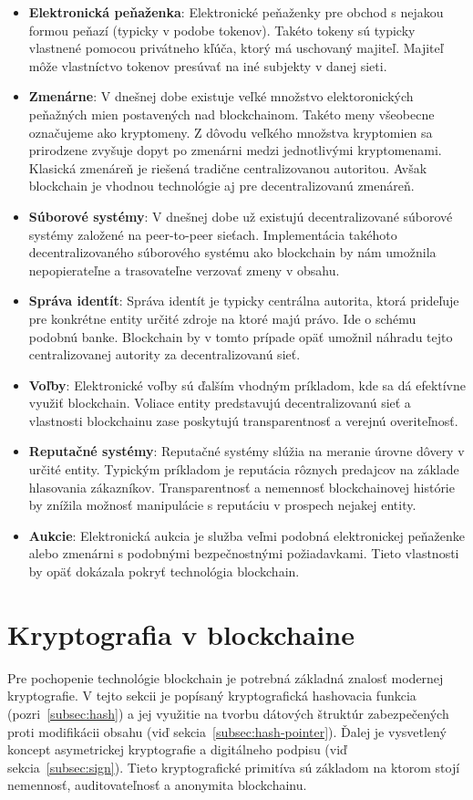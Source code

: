 \begin{itemize}
	\item \textbf{Elektronická peňaženka}: Elektronické peňaženky pre obchod s nejakou formou peňazí (typicky v podobe tokenov). Takéto tokeny sú typicky vlastnené pomocou privátneho kľúča, ktorý má uschovaný majiteľ. Majiteľ môže vlastníctvo tokenov presúvať na iné subjekty v danej sieti.
	\item \textbf{Zmenárne}: V dnešnej dobe existuje veľké množstvo elektoronických peňažných mien postavených nad blockchainom. Takéto meny všeobecne označujeme ako kryptomeny. Z dôvodu veľkého množstva kryptomien sa prirodzene zvyšuje dopyt po zmenárni medzi jednotlivými kryptomenami. Klasická zmenáreň je riešená tradične centralizovanou autoritou. Avšak blockchain je vhodnou technológie aj pre decentralizovanú zmenáreň.
	\item \textbf{Súborové systémy}: V dnešnej dobe už existujú decentralizované súborové systémy založené na peer-to-peer sieťach. Implementácia takéhoto decentralizovaného súborového systému ako blockchain by nám umožnila nepopierateľne a trasovateľne verzovať zmeny v obsahu.
	\item \textbf{Správa identít}: Správa identít je typicky centrálna autorita, ktorá prideľuje pre konkrétne entity určité zdroje na ktoré majú právo. Ide o schému podobnú banke. Blockchain by v tomto prípade opäť umožnil náhradu tejto centralizovanej autority za decentralizovanú sieť.
	\item \textbf{Voľby}: Elektronické voľby sú ďalším vhodným príkladom, kde sa dá efektívne využiť blockchain. Voliace entity predstavujú decentralizovanú sieť a vlastnosti blockchainu zase poskytujú transparentnosť a verejnú overiteľnosť.
	\item \textbf{Reputačné systémy}: Reputačné systémy slúžia na meranie úrovne dôvery v určité entity. Typickým príkladom je reputácia rôznych predajcov na základe hlasovania zákazníkov. Transparentnosť a nemennosť blockchainovej histórie by znížila možnosť manipulácie s reputáciu v prospech nejakej entity.
	\item \textbf{Aukcie}: Elektronická aukcia je služba veľmi podobná elektronickej peňaženke alebo zmenárni s podobnými bezpečnostnými požiadavkami. Tieto vlastnosti by opäť dokázala pokryť technológia blockchain.
\end{itemize}

\section{Kryptografia v blockchaine}\label{sec:crypto}
Pre pochopenie technológie blockchain je potrebná základná znalosť modernej kryptografie. V tejto sekcii je popísaný kryptografická hashovacia funkcia (pozri~\ref{subsec:hash}) a jej využitie na tvorbu dátových štruktúr zabezpečených proti modifikácii obsahu (viď sekcia~\ref{subsec:hash-pointer}). Ďalej je vysvetlený koncept asymetrickej kryptografie a digitálneho podpisu (viď sekcia~\ref{subsec:sign}). Tieto kryptografické primitíva sú základom na ktorom stojí nemennosť, auditovateľnosť a anonymita blockchainu.

